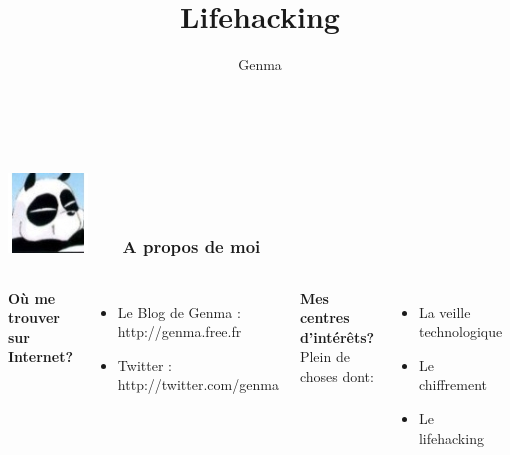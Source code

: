 \documentclass{beamer}
\title[Lifehacking]{Lifehacking}
\author{Genma}
\begin{document}
\begin{frame}
	\titlepage
	\vfill
	\begin{center}
		\\[2.5ex]
		{\tiny\CcNote{\CcLongnameByNcSa}}
		\vspace*{-2.5ex}
	\end{center}
\end{frame}





\begin{frame}
\frametitle{\includegraphics[scale=0.4]{./Genma.jpg} \ \ \  A propos de moi  }
\begin{columns}[c] 

\textbf{Où me trouver sur Internet?}
\begin{itemize}
\item Le Blog de Genma : http://genma.free.fr
\item Twitter : http://twitter.com/genma
\end{itemize}

\textbf{Mes centres d'intérêts?}
\\ Plein de choses dont:
\begin{itemize}
\item La veille technologique
\item Le chiffrement
\item Le lifehacking
\end{itemize}

\includegraphics[width=5cm,height=5cm]{blog.png} 

\end{columns}
\end{frame}
\end{document}
